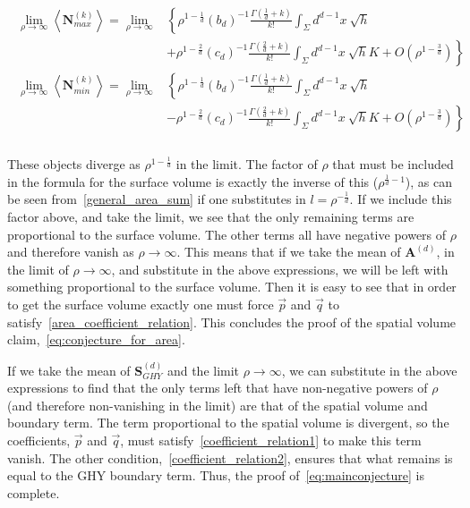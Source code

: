 \documentclass[12pt]{article}
\begin{document}
\begin{gather}\label{eq:nmax_nmin_final}
\begin{aligned}
\lim_{\rho\rightarrow\infty}\left\langle \textbf{N}_{max}^{ (k)}\right\rangle = \lim_{\rho\rightarrow\infty} & \left\lbrace \rho^{1-\frac{1}{d}} \left (b_d\right)^{-1} \frac{\Gamma\left (\frac{1}{d}+k\right)}{k!}
\int_{\Sigma}d^{d-1}x\: \sqrt{h} \right.
 \\
 &  \left. +\rho^{1-\frac{2}{d}} \left (c_d\right)^{-1} \frac{\Gamma\left (\frac{2}{d}+k\right)}{k!}
\int_{\Sigma}d^{d-1}x\: \sqrt{h}K + O\left (\rho^{1-\frac{3}{d}} \right) \right\rbrace
\\
\lim_{\rho\rightarrow\infty}\left\langle \textbf{N}_{min}^{ (k)}\right\rangle = \lim_{\rho\rightarrow\infty} & \left\lbrace \rho^{1-\frac{1}{d}} \left (b_d\right)^{-1} \frac{\Gamma\left (\frac{1}{d}+k\right)}{k!}
\int_{\Sigma}d^{d-1}x\: \sqrt{h} \right.
 \\
 &  \left. -\rho^{1-\frac{2}{d}} \left (c_d\right)^{-1} \frac{\Gamma\left (\frac{2}{d}+k\right)}{k!}
\int_{\Sigma}d^{d-1}x\: \sqrt{h}K + O\left (\rho^{1-\frac{3}{d}} \right) \right\rbrace
\\
\end{aligned}
\end{gather}

These objects diverge as $\rho^{1-\frac{1}{d}}$ in the limit. The factor of $\rho$ that must be included in the formula for the surface volume is exactly the inverse of this ($\rho^{\frac{1}{d}-1}$), as can be seen from~\eqref{general_area_sum} if one substitutes in $l=\rho^{-\frac{1}{d}}$. If we include this factor above, and take the limit, we see that the only remaining terms are proportional to the surface volume. The other terms all have negative powers of $\rho$ and therefore vanish as $\rho\rightarrow\infty$. This means that if we take the mean of $\textbf{A}^{ (d)}$, in the limit of $\rho\rightarrow\infty$, and substitute in the above expressions, we will be left with something proportional to the surface volume. Then it is easy to see that in order to get the surface volume exactly one must force $\vec{p}$ and $\vec{q}$ to satisfy~\eqref{area_coefficient_relation}. This concludes the proof of the spatial volume claim,~\eqref{eq:conjecture_for_area}. 

If we take the mean of $\textbf{S}^{ (d)}_{GHY}$ and the limit $\rho\rightarrow\infty$, we can substitute in the above expressions to find that the only terms left that have non-negative powers of $\rho$ (and therefore non-vanishing in the limit) are that of the spatial volume and boundary term. The term proportional to the spatial volume is divergent, so the coefficients, $\vec{p}$ and $\vec{q}$, must satisfy~\eqref{coefficient_relation1} to make this term vanish. The other condition,~\eqref{coefficient_relation2}, ensures that what remains is equal to the GHY boundary term. Thus, the proof of~\eqref{eq:mainconjecture} is complete.
\end{document}
